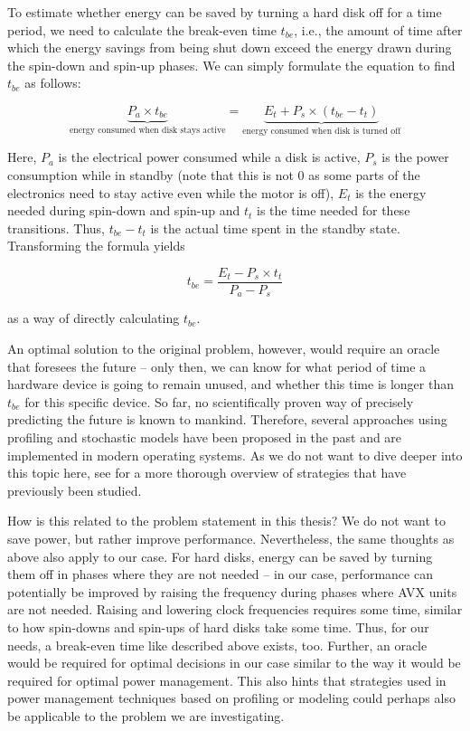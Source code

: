 {To estimate whether energy can be saved by turning a hard disk off for a time period, we need to calculate the break-even time $t_{be}$, i.e., the amount of time after which the energy savings from being shut down exceed the energy drawn during the spin-down and spin-up phases. We can simply formulate the equation to find $t_{be}$ as follows:

\begin{displaymath}
\underbrace{P_a \times t_{be}}_{\text{energy consumed when disk stays active}} = \underbrace{E_t + P_s \times (t_{be} - t_t)}_{\text{energy consumed when disk is turned off}}
\end{displaymath}

Here, $P_a$ is the electrical power consumed while a disk is active, $P_s$ is the power consumption while in standby (note that this is not $0$ as some parts of the electronics need to stay active even while the motor is off), $E_t$ is the energy needed during spin-down and spin-up and $t_t$ is the time needed for these transitions. Thus, $t_{be} - t_t$ is the actual time spent in the standby state. Transforming the formula yields

\begin{displaymath}
t_{be} = \frac{E_t - P_s \times t_t}{P_a - P_s}
\end{displaymath}

\noindent as a way of directly calculating $t_{be}$.

An optimal solution to the original problem, however, would require an oracle that foresees the future -- only then, we can know for what period of time a hardware device is going to remain unused, and whether this time is longer than $t_{be}$ for this specific device. So far, no scientifically proven way of precisely predicting the future is known to mankind. Therefore, several approaches using profiling and stochastic models have been proposed in the past and are implemented in modern operating systems. As we do not want to dive deeper into this topic here, see \citeauthor{lu2001comparing} \cite{lu2001comparing} for a more thorough overview of strategies that have previously been studied.

How is this related to the problem statement in this thesis? We do not want to save power, but rather improve performance. Nevertheless, the same thoughts as above also apply to our case. For hard disks, energy can be saved by turning them off in phases where they are not needed -- in our case, performance can potentially be improved by raising the frequency during phases where \gls{AVX} units are not needed. Raising and lowering clock frequencies requires some time, similar to how spin-downs and spin-ups of hard disks take some time. Thus, for our needs, a break-even time like described above exists, too. Further, an oracle would be required for optimal decisions in our case similar to the way it would be required for optimal power management. This also hints that strategies used in power management techniques based on profiling or modeling could perhaps also be applicable to the problem we are investigating.

}
